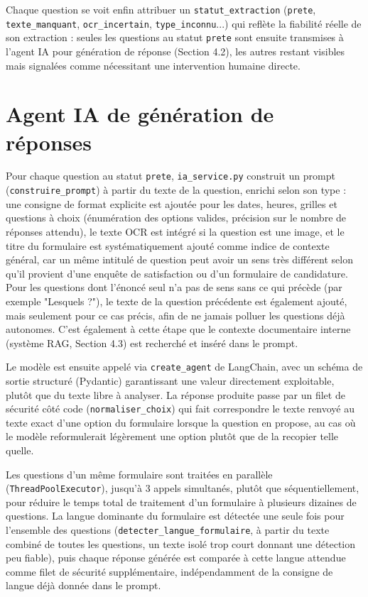 \documentclass[12pt,a4paper]{report}
\begin{document}
Chaque question se voit enfin attribuer un \texttt{statut\_extraction}
(\texttt{prete}, \texttt{texte\_manquant}, \texttt{ocr\_incertain},
\texttt{type\_inconnu}...) qui reflète la fiabilité réelle de son
extraction : seules les questions au statut \texttt{prete} sont ensuite
transmises à l'agent IA pour génération de réponse (Section 4.2), les
autres restant visibles mais signalées comme nécessitant une
intervention humaine directe.

\section{Agent IA de génération de réponses}

Pour chaque question au statut \texttt{prete}, \texttt{ia\_service.py}
construit un prompt (\texttt{construire\_prompt}) à partir du texte de
la question, enrichi selon son type : une consigne de format explicite
est ajoutée pour les dates, heures, grilles et questions à choix
(énumération des options valides, précision sur le nombre de réponses
attendu), le texte OCR est intégré si la question est une image, et le
titre du formulaire est systématiquement ajouté comme indice de
contexte général, car un même intitulé de question peut avoir un sens très
différent selon qu'il provient d'une enquête de satisfaction ou d'un
formulaire de candidature. Pour les questions dont l'énoncé seul n'a pas
de sens sans ce qui précède (par exemple "Lesquels ?"), le texte de la
question précédente est également ajouté, mais seulement pour ce cas
précis, afin de ne jamais polluer les questions déjà autonomes. C'est
également à cette étape que le contexte documentaire interne
(système RAG, Section 4.3) est recherché et inséré dans le prompt.

Le modèle est ensuite appelé via \texttt{create\_agent} de LangChain,
avec un schéma de sortie structuré (Pydantic) garantissant une valeur
directement exploitable, plutôt que du texte libre à analyser. La
réponse produite passe par un filet de sécurité côté code
(\texttt{normaliser\_choix}) qui fait correspondre le texte renvoyé au
texte exact d'une option du formulaire lorsque la question en propose,
au cas où le modèle reformulerait légèrement une option plutôt que de la
recopier telle quelle.

Les questions d'un même formulaire sont traitées en parallèle
(\texttt{ThreadPoolExecutor}), jusqu'à 3 appels simultanés, plutôt que
séquentiellement, pour réduire le temps total de traitement d'un
formulaire à plusieurs dizaines de questions. La langue dominante du
formulaire est détectée une seule fois pour l'ensemble des questions
(\texttt{detecter\_langue\_formulaire}, à partir du texte combiné de
toutes les questions, un texte isolé trop court donnant une détection
peu fiable), puis chaque réponse générée est comparée à cette langue
attendue comme filet de sécurité supplémentaire, indépendamment de la
consigne de langue déjà donnée dans le prompt.
\end{document}
